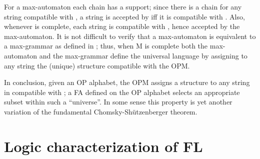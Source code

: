 \documentclass[10pt,a4paper,runningheads]{llncs}
\begin{document}
For a max-automaton  each chain has a support;
since there is a chain  for any string 
compatible with , a string is accepted by 
iff it is compatible with .  Also, whenever  is complete, each
string is compatible with , hence accepted by the max-automaton. It
is not difficult to verify that a max-automaton is equivalent to a
max-grammar as defined in \cite{Crespi-ReghizziMM1978}; thus, when M
is complete both the max-automaton and the max-grammar define the
universal language  by assigning to any string the (unique)
structure compatible with the OPM.


\medskip

In conclusion, given an OP alphabet, the OPM  assigns a structure
to any string in  compatible with ; a FA defined on the
OP alphabet selects an appropriate subset within such a
``universe''. In some sense this property is yet another variation of
the fundamental Chomsky-Sh\"utzenberger theorem.















\section{Logic characterization of FL}\label{sec:logic}
\end{document}
